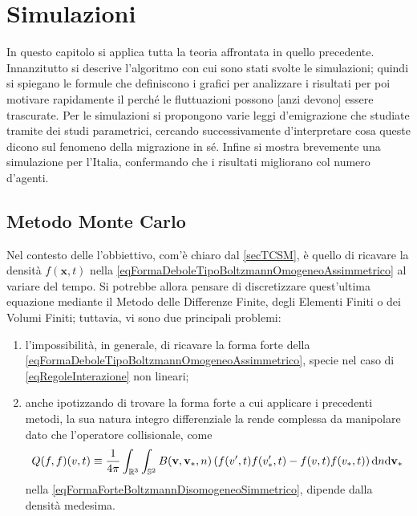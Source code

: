 

\chapter{Simulazioni}\label{secSimulazioni}

    In questo capitolo si applica tutta la teoria affrontata in quello precedente. Innanzitutto si descrive l'algoritmo con cui sono stati svolte le simulazioni; quindi si spiegano le formule che definiscono i grafici per analizzare i risultati per poi motivare rapidamente il perché le fluttuazioni possono [anzi devono] essere trascurate. Per le simulazioni si propongono varie leggi d'emigrazione che studiate tramite dei studi parametrici, cercando successivamente d'interpretare cosa queste dicono sul fenomeno della migrazione in sé. Infine si mostra brevemente una simulazione per l'Italia, confermando che i risultati migliorano col numero d'agenti.

    \section{Metodo Monte Carlo}\label{secMetodoMonteCarlo}

        Nel contesto delle \TCSMA{} l'obbiettivo, com'è chiaro dal \cref{secTCSM}, è quello di ricavare la densità \(f(\mathbf x,t)\) nella \ref{eqFormaDeboleTipoBoltzmannOmogeneoAssimmetrico} al variare del tempo. Si potrebbe allora pensare di discretizzare quest'ultima equazione mediante il Metodo delle Differenze Finite, degli Elementi Finiti o dei Volumi Finiti; tuttavia, vi sono due principali problemi:
        
        \begin{enumerate}[
            label=\arabic*.,
        ]
            \item l'impossibilità, in generale, di ricavare la forma forte della \ref{eqFormaDeboleTipoBoltzmannOmogeneoAssimmetrico}, specie nel caso di \ref{eqRegoleInterazione} non lineari;
            \item anche ipotizzando di trovare la forma forte a cui applicare i precedenti metodi, la sua natura integro differenziale la rende complessa da manipolare dato che l'operatore collisionale\footnotemark{}, come%
            \[
                Q(f,f)(v,t)\equiv
                \frac1{4\pi}\int_{\mathbb R^3}\int_{\mathbb S^2}
                B(\mathbf v,\mathbf v_*,n)
                \left(f(v',t)f(v'_*,t)-f(v,t)f(v_*,t)\right)
                \mathrm{d} n\mathrm{d}\mathbf v_*
            \]
            nella \cref{eqFormaForteBoltzmannDisomogeneoSimmetrico}, dipende dalla densità medesima.
        \end{enumerate}

